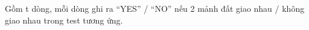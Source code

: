 Gồm t dòng, mỗi dòng ghi ra “YES” / “NO” nếu 2 mảnh đất giao nhau / không giao nhau trong test tương ứng.